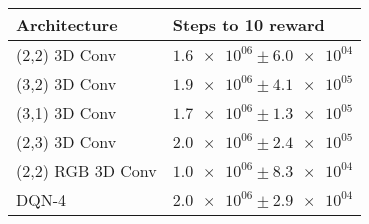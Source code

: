 \begin{tabular}{ll}
\hline
 Architecture      & Steps to 10 reward                \\
\hline
 (2,2) 3D Conv     & $\num{1.6e+06} \pm \num{6.0e+04}$ \\
 (3,2) 3D Conv     & $\num{1.9e+06} \pm \num{4.1e+05}$ \\
 (3,1) 3D Conv     & $\num{1.7e+06} \pm \num{1.3e+05}$ \\
 (2,3) 3D Conv     & $\num{2.0e+06} \pm \num{2.4e+05}$ \\
 (2,2) RGB 3D Conv & $\num{1.0e+06} \pm \num{8.3e+04}$ \\
 DQN-4             & $\num{2.0e+06} \pm \num{2.9e+04}$ \\
\hline
\end{tabular}